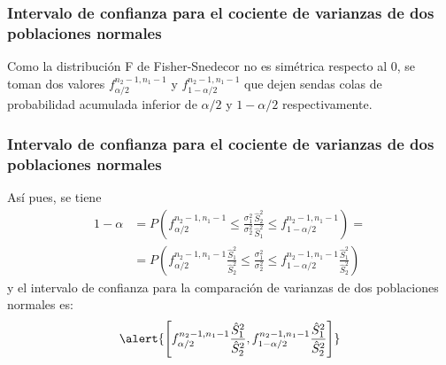 \begin{frame}
\frametitle{Intervalo de confianza para el cociente de varianzas de dos poblaciones normales}
Como la distribución F de Fisher-Snedecor no es simétrica respecto al 0, se toman dos valores $f^{n_2-1,n_1-1}_{\alpha/2}$ y
$f^{n_2-1,n_1-1}_{1-\alpha/2}$ que dejen sendas colas de probabilidad acumulada inferior de $\alpha/2$ y $1-\alpha/2$ respectivamente.
\begin{center}
\scalebox{0.8}{}
\end{center}
\end{frame}


\begin{frame}
\frametitle{Intervalo de confianza para el cociente de varianzas de dos poblaciones normales}
Así pues, se tiene
\[
\begin{align*}
1-\alpha &= P\left(f^{n_2-1,n_1-1}_{\alpha/2}\leq \frac{\sigma_1^2}{\sigma_2^2}\frac{\hat{S}_2^2}{\hat{S}_1^2}  \leq
f^{n_2-1,n_1-1}_{1-\alpha/2}\right) = \\ &= P\left(f^{n_2-1,n_1-1}_{\alpha/2}\frac{\hat{S}_1^2}{\hat{S}_2^2} \leq
\frac{\sigma_1^2}{\sigma_2^2}  \leq f^{n_2-1,n_1-1}_{1-\alpha/2}\frac{\hat{S}_1^2}{\hat{S}_2^2}\right)
\end{align*}
\]
y el intervalo de confianza para la comparación de varianzas de dos poblaciones normales es:
\[
\alert{\left[f^{n_2-1,n_1-1}_{\alpha/2}\frac{\hat{S}_1^2}{\hat{S}_2^2},f^{n_2-1,n_1-1}_{1-\alpha/2}\frac{\hat{S}_1^2}{\hat{S}_2^2}\right]}
\]
\end{frame}


